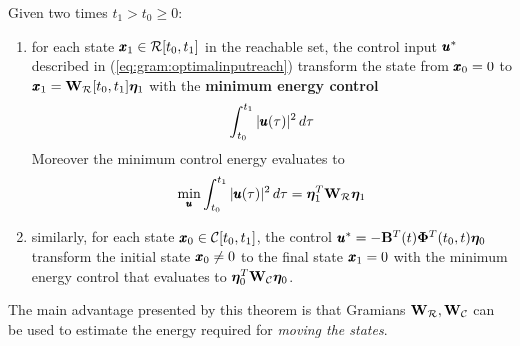 	\begin{theorem}
		Given two times $t_1 > t_0 \geq 0$:
		\begin{enumerate}[\itshape i)]
			\item for each state $\pmb{x}_1 \in \mathcal R[t_0,t_1]$ in the reachable set, the control input $\pmb{u}^*$ described in (\ref{eq:gram:optimalinputreach}) transform the state from $\pmb{x}_0 = 0$ to $\pmb{x}_1 = \mathbf{W}_\mathcal R[t_0,t_1] \boldsymbol{\eta}_1$ with the \textbf{minimum energy control}
			\[ \int_{t_0}^{t_1} |\pmb{u}(\tau)|^2\, d\tau \]
			Moreover the minimum control energy evaluates to
			\begin{equation}
				\min_{\pmb{u}} \int_{t_0}^{t_1} |\pmb{u}(\tau)|^2\, d\tau = \boldsymbol{\eta}_1^T \mathbf{W}_\mathcal R \boldsymbol{\eta}_1 
			\end{equation}
			\item similarly, for each state $\pmb{x}_0 \in \mathcal C[t_0,t_1]$, the control $\pmb{u}^* = - \mathbf{B}^T(t) \mathbf{\Phi}^T(t_0,t)\boldsymbol{\eta}_0$ transform the initial state $\pmb{x}_0 \neq 0$ to the final state $\pmb{x}_1 = 0$ with the minimum energy control that evaluates to $\boldsymbol{\eta}_0^T \mathbf{W}_\mathcal C \boldsymbol{\eta}_0$.
		\end{enumerate}
	\end{theorem}
	The main advantage presented by this theorem is that Gramians $\mathbf{W}_\mathcal R,\mathbf{W}_\mathcal C$ can be used to estimate the energy required for \textit{moving the states}.
	
